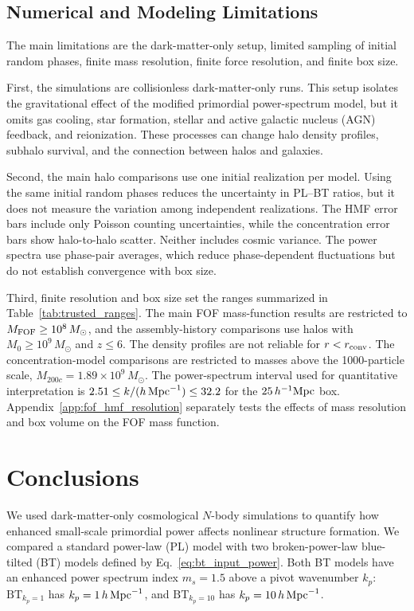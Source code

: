 \documentclass[
 reprint,
 superscriptaddress,
 nofootinbib,
 nobibnotes,
 amsmath,
 amssymb,
 aps,
 prd,
 floatfix,
 longbibliography
]{revtex4-2}
\DeclareRobustCommand{\BTKPone}{\ensuremath{\mathrm{BT}_{k_p=1}}}
\DeclareRobustCommand{\BTKPten}{\ensuremath{\mathrm{BT}_{k_p=10}}}
\begin{document}
\subsection{Numerical and Modeling Limitations}

The main limitations are the dark-matter-only setup, limited sampling of initial random phases, finite mass resolution, finite force resolution, and finite box size.

First, the simulations are collisionless dark-matter-only runs. This setup isolates the gravitational effect of the modified primordial power-spectrum model, but it omits gas cooling, star formation, stellar and active galactic nucleus (AGN) feedback, and reionization. These processes can change halo density profiles, subhalo survival, and the connection between halos and galaxies.


Second, the main halo comparisons use one initial realization per model. Using the same initial random phases reduces the uncertainty in PL--BT ratios, but it does not measure the variation among independent realizations. The HMF error bars include only Poisson counting uncertainties, while the concentration error bars show halo-to-halo scatter. Neither includes cosmic variance. The power spectra use phase-pair averages, which reduce phase-dependent fluctuations but do not establish convergence with box size.

Third, finite resolution and box size set the ranges summarized in Table~\ref{tab:trusted_ranges}. The main FOF mass-function results are restricted to \(M_{\rm FOF}\ge10^8\,M_\odot\), and the assembly-history comparisons use halos with \(M_0\ge10^9\,M_\odot\) and \(z\le6\). The density profiles are not reliable for \(r<r_{\rm conv}\). The concentration-model comparisons are restricted to masses above the 1000-particle scale, \(M_{200c}=1.89\times10^9\,M_\odot\). The power-spectrum interval used for quantitative interpretation is \(2.51\le k/(h\,{\rm Mpc}^{-1})\le32.2\) for the \(25\,h^{-1}{\rm Mpc}\) box. Appendix~\ref{app:fof_hmf_resolution} separately tests the effects of mass resolution and box volume on the FOF mass function.

\section{Conclusions}
\label{sec:conclusion}


We used dark-matter-only cosmological \(N\)-body simulations to quantify how enhanced small-scale primordial power affects nonlinear structure formation. We compared a standard power-law (PL) model with two broken-power-law blue-tilted (BT) models defined by Eq.~\eqref{eq:bt_input_power}. Both BT models have an enhanced power spectrum index \(m_s=1.5\) above a pivot wavenumber \(k_p\): \BTKPone{} has \(k_p=1\,h\,{\rm Mpc}^{-1}\), and \BTKPten{} has \(k_p=10\,h\,{\rm Mpc}^{-1}\).
\end{document}
